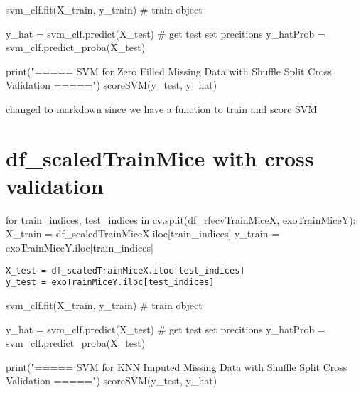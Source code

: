 \documentclass[11pt]{article}
\begin{document}
svm\_clf.fit(X\_train, y\_train) \# train object

y\_hat = svm\_clf.predict(X\_test) \# get test set precitions y\_hatProb
= svm\_clf.predict\_proba(X\_test)

print("===== SVM for Zero Filled Missing Data with Shuffle Split Cross
Validation =====") scoreSVM(y\_test, y\_hat)

    changed to markdown since we have a function to train and score SVM

\section{df\_scaledTrainMice with cross
validation}\label{df_scaledtrainmice-with-cross-validation}

for train\_indices, test\_indices in cv.split(df\_rfecvTrainMiceX,
exoTrainMiceY): X\_train = df\_scaledTrainMiceX.iloc{[}train\_indices{]}
y\_train = exoTrainMiceY.iloc{[}train\_indices{]}

\begin{verbatim}
X_test = df_scaledTrainMiceX.iloc[test_indices]
y_test = exoTrainMiceY.iloc[test_indices]
\end{verbatim}

svm\_clf.fit(X\_train, y\_train) \# train object

y\_hat = svm\_clf.predict(X\_test) \# get test set precitions y\_hatProb
= svm\_clf.predict\_proba(X\_test)

print("===== SVM for KNN Imputed Missing Data with Shuffle Split Cross
Validation =====") scoreSVM(y\_test, y\_hat)


    
    
    
    
\end{document}
